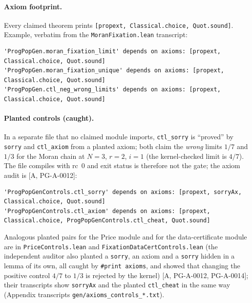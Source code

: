 \documentclass[11pt]{article}
\theoremstyle{remark}
\newcommand{\tier}[1]{\textsf{[#1]}}
\newcommand{\lean}[1]{\texttt{#1}}
\begin{document}
\begin{table}[ht]\centering\small
{}
\caption{Lean sources (\texttt{formal\_cert/Programmes/PopGen/}; module names are \texttt{Programmes.PopGen.}$\langle$role$\rangle$). All compiles rc~0; the ``axiom lines'' are
\lean{\#print axioms} outputs, each exactly \lean{[propext, Classical.choice, Quot.sound]} for a claimed declaration; the two lines of each
planted-controls file are the planted \lean{sorry} and planted axiom, deliberately outside the allowlist.}\label{tab:src}
\end{table}

\paragraph{Axiom footprint.} Every claimed theorem prints \lean{[propext, Classical.choice, Quot.sound]}. Example, verbatim from the
\texttt{MoranFixation.lean} transcript:

\begin{lstlisting}[basicstyle=\ttfamily\scriptsize]
'ProgPopGen.moran_fixation_limit' depends on axioms: [propext, Classical.choice, Quot.sound]
'ProgPopGen.moran_fixation_unique' depends on axioms: [propext, Classical.choice, Quot.sound]
'ProgPopGen.ctl_neg_wrong_limits' depends on axioms: [propext, Classical.choice, Quot.sound]
\end{lstlisting}

\paragraph{Planted controls (caught).} In a separate file that no claimed module imports, \lean{ctl\_sorry} is ``proved'' by
\lean{sorry} and \lean{ctl\_axiom} from a planted axiom; both claim the \emph{wrong} limits $1/7$ and $1/3$ for the Moran chain at
$N=3$, $r=2$, $i=1$ (the kernel-checked limit is $4/7$). The file compiles with rc~0 and exit status is therefore not the gate; the
axiom audit is \tier{A, PG-A-0012}:


\begin{lstlisting}[basicstyle=\ttfamily\scriptsize]
'ProgPopGenControls.ctl_sorry' depends on axioms: [propext, sorryAx, Classical.choice, Quot.sound]
'ProgPopGenControls.ctl_axiom' depends on axioms: [propext, Classical.choice, ProgPopGenControls.ctl_cheat, Quot.sound]
\end{lstlisting}
Analogous planted pairs for the Price module and for the data-certificate module are in \texttt{PriceControls.lean} and
\texttt{FixationDataCertControls.lean} (the independent auditor also planted a \lean{sorry}, an axiom and a \lean{sorry} hidden in a lemma of its own, all caught by \lean{\#print axioms}, and showed that changing the positive control $4/7$ to $1/3$ is rejected by the kernel) \tier{A, PG-A-0012, PG-A-0014}; their transcripts show \lean{sorryAx} and the planted
\lean{ctl\_cheat} in the same way (Appendix transcripts \texttt{gen/axioms\_controls\_*.txt}).
\end{document}
